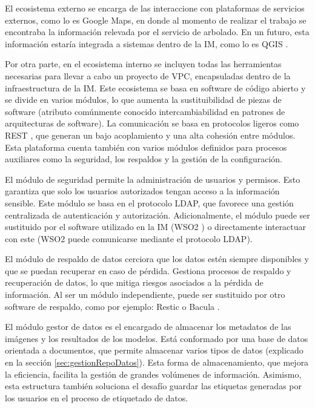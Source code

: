 El ecosistema externo se encarga de las interaccione con plataformas de servicios externos, como lo es Google Maps, en donde al momento de realizar el trabajo se encontraba la información relevada por el servicio de arbolado. En un futuro, esta información estaría integrada a sistemas dentro de la IM, como lo es QGIS \citep{wikipedia_qgis_2025}.

Por otra parte, en el ecosistema interno se incluyen todas las herramientas necesarias para llevar a cabo un proyecto de VPC, encapsuladas dentro de la infraestructura de la IM. Este ecosistema se basa en software de código abierto y se divide en varios módulos, lo que aumenta la sustituibilidad de piezas de software (atributo comúnmente conocido intercambiabilidad en patrones de arquitecturas de software). La comunicación se basa en protocolos ligeros como REST \citep{wikipedia_protocolo_2024}, que generan un bajo acoplamiento y una alta cohesión entre módulos. Esta plataforma cuenta también con varios módulos definidos para procesos auxiliares como la seguridad, los respaldos y la gestión de la configuración.

El módulo de seguridad permite la administración de usuarios y permisos. Esto garantiza que solo los usuarios autorizados tengan acceso a la información sensible. Este módulo se basa en el protocolo LDAP, que favorece una gestión centralizada de autenticación y autorización. Adicionalmente, el módulo puede ser sustituido por el software utilizado en la IM (WSO2 \citep{wso2_deliver_nodate}) o directamente interactuar con este (WSO2 puede comunicarse mediante el protocolo LDAP).

El módulo de respaldo de datos cerciora que los datos estén siempre disponibles y que se puedan recuperar en caso de pérdida. Gestiona procesos de respaldo y recuperación de datos, lo que mitiga riesgos asociados a la pérdida de información. Al ser un módulo independiente, puede ser sustituido por otro software de respaldo, como por ejemplo: Restic \citep{restic_restic_nodate} o Bacula \citep{bacula_documentation_nodate}.

El módulo gestor de datos es el encargado de almacenar los metadatos de las imágenes y los resultados de los modelos. Está conformado por una base de datos orientada a documentos, que permite almacenar varios tipos de datos (explicado en la sección \ref{sec:gestionRepoDatos}). Esta forma de almacenamiento, que mejora la eficiencia, facilita la gestión de grandes volúmenes de información. Asimismo, esta estructura también soluciona el desafío guardar las etiquetas generadas por los usuarios en el proceso de etiquetado de datos.

